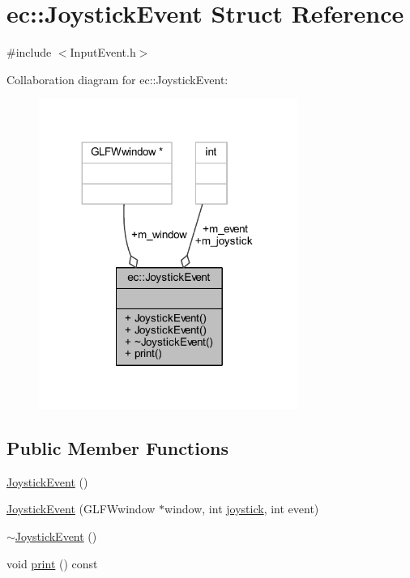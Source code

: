 \hypertarget{structec_1_1_joystick_event}{}\section{ec\+:\+:Joystick\+Event Struct Reference}
\label{structec_1_1_joystick_event}


{\ttfamily \#include $<$Input\+Event.\+h$>$}



Collaboration diagram for ec\+:\+:Joystick\+Event\+:\nopagebreak
\begin{figure}[H]
\begin{center}
\leavevmode
\includegraphics[width=239pt]{structec_1_1_joystick_event__coll__graph}
\end{center}
\end{figure}
\subsection*{Public Member Functions}
\begin{DoxyCompactItemize}
\item 
\mbox{\hyperlink{structec_1_1_joystick_event_a04113c84c127415b3937c214b3e6eb92}{Joystick\+Event}} ()
\item 
\mbox{\hyperlink{structec_1_1_joystick_event_ae08b4530293362fa1ecf1446f13e91e7}{Joystick\+Event}} (G\+L\+F\+Wwindow $\ast$window, int \mbox{\hyperlink{namespaceec_a5de6bdb8c4b2ed6e590e721ec998f964a2ed69833bf8cb33c80eaf0daa892400e}{joystick}}, int event)
\item 
\mbox{\hyperlink{structec_1_1_joystick_event_a182ea7dcfcd2e363909eb8ea63a41df8}{$\sim$\+Joystick\+Event}} ()
\item 
void \mbox{\hyperlink{structec_1_1_joystick_event_a8fe710e92962e5b7376167deeac260d7}{print}} () const
\end{DoxyCompactItemize}
